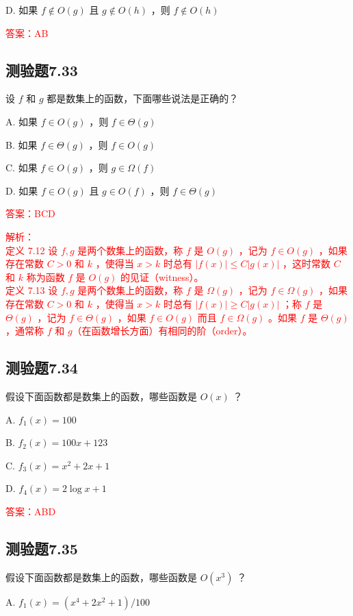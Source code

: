 \documentclass[UTF8, heading=true]{ctexart}
\begin{document}
D. 如果 $f \notin O(g)$ 且 $g \notin O(h)$ ，则 $f \notin O(h)$

\textcolor{red}{答案：AB}

\subsection{测验题7.33}

设 $f$ 和 $g$ 都是数集上的函数，下面哪些说法是正确的？

A. 如果 $f \in O(g)$ ，则 $f \in \Theta(g)$

B. 如果 $f \in \Theta(g)$ ，则 $f \in O(g)$

C. 如果 $f \in O(g)$ ，则 $g \in \Omega(f)$

D. 如果 $f \in O(g)$ 且 $g \in O(f)$ ，则 $f \in \Theta(g)$

\textcolor{red}{答案：BCD}

\textcolor{red}{解析：\\ \indent 定义 7.12 设 $f, g$ 是两个数集上的函数，称 $f$ 是 $O(g)$ ，记为 $f \in O(g)$ ，如果存在常数 $C>0$ 和 $k$ ，使得当 $x>k$ 时总有 $|f(x)| \leq C|g(x)|$ ，这时常数 $C$ 和 $k$ 称为函数 $f$ 是 $O(g)$ 的见证（witness）。
\\ \indent 定义 7.13 设 $f, g$ 是两个数集上的函数，称 $f$ 是 $\Omega(g)$ ，记为 $f \in \Omega(g)$ ，如果存在常数 $C>0$ 和 $k$ ，使得当 $x>k$ 时总有 $|f(x)| \geq C|g(x)|$ ；称 $f$ 是 $\Theta(g)$ ，记为 $f \in \Theta(g)$ ，如果 $f \in O(g)$ 而且 $f \in \Omega(g)$ 。如果 $f$ 是 $\Theta(g)$ ，通常称 $f$ 和 $g$（在函数增长方面）有相同的阶（order）。}

\subsection{测验题7.34}

假设下面函数都是数集上的函数，哪些函数是 $O(x)$ ？

A. $f_1(x)=100$

B. $f_2(x)=100 x+123$

C. $f_3(x)=x^2+2 x+1$

D. $f_4(x)=2 \log x+1$

\textcolor{red}{答案：ABD}

\subsection{测验题7.35}

假设下面函数都是数集上的函数，哪些函数是 $O\left(x^3\right)$ ？

A. $f_1(x)=\left(x^4+2 x^2+1\right) / 100$
\end{document}
